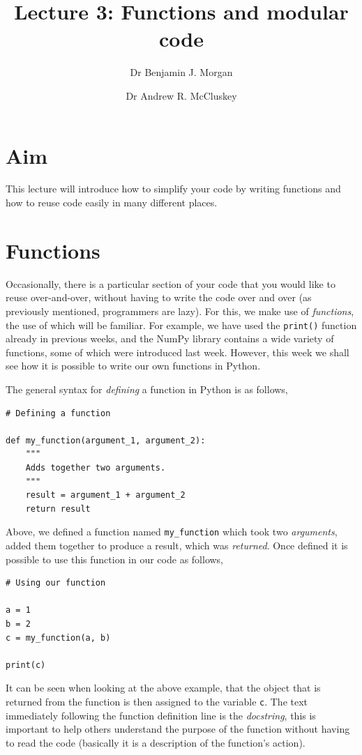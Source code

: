 \documentclass[a4paper]{article}
\title{Lecture 3: Functions and modular code}
\author[1]{Dr Benjamin J. Morgan}
\author[1,2]{Dr Andrew R. McCluskey}
\affil[1]{Department of Chemistry, University of Bath, email: b.j.morgan@bath.ac.uk}
\affil[2]{Diamond Light Source, email: andrew.mccluskey@diamond.ac.uk}
\begin{document}
\maketitle

\section*{Aim}
This lecture will introduce how to simplify your code by writing functions and how to reuse code easily in many different places.

\section{Functions}

Occasionally, there is a particular section of your code that you would like to reuse over-and-over, without having to write the code over and over (as previously mentioned, programmers are lazy).
For this, we make use of \emph{functions}, the use of which will be familiar.
For example, we have used the \texttt{print()} function already in previous weeks, and the NumPy library contains a wide variety of functions, some of which were introduced last week.
However, this week we shall see how it is possible to write our own functions in Python.

The general syntax for \emph{defining} a function in Python is as follows,
\begin{lstlisting}
# Defining a function

def my_function(argument_1, argument_2):
    """
    Adds together two arguments.
    """
    result = argument_1 + argument_2
    return result
\end{lstlisting}
Above, we defined a function named \texttt{my\_function} which took two \emph{arguments}, added them together to produce a result, which was \emph{returned}.
Once defined it is possible to use this function in our code as follows,
\begin{lstlisting}
# Using our function

a = 1
b = 2
c = my_function(a, b)

print(c)
\end{lstlisting}
It can be seen when looking at the above example, that the object that is returned from the function is then assigned to the variable \texttt{c}.
The text immediately following the function definition line is the \emph{docstring}, this is important to help others understand the purpose of the function without having to read the code (basically it is a description of the function's action).
\end{document}
